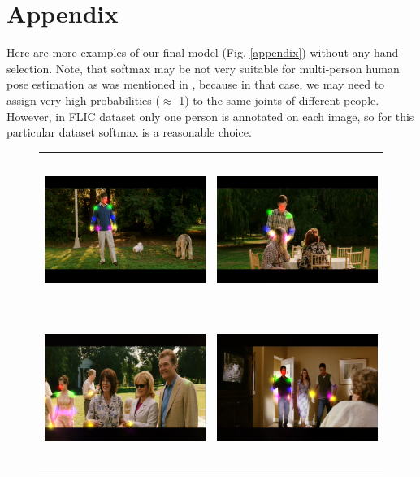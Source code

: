 \documentclass[a4paper,10pt]{article}
\begin{document}
	\section{Appendix}
	Here are more examples of our final model (Fig. \ref{appendix}) without any hand selection. Note, that softmax may be not very suitable for multi-person human pose estimation as was mentioned in \cite{deepcut}, because in that case, we may need to assign very high probabilities ($\approx$ 1) to the same joints of different people. However, in FLIC dataset only one person is annotated on each image, so for this particular dataset softmax is a reasonable choice.
	\begin{figure}[H]
		\begin{tabular}{cc}
			\includegraphics[height=4.9cm]{img/ap_sm1.png} & 
			\includegraphics[height=4.9cm]{img/ap_sm2.png} \\
			\includegraphics[height=4.9cm]{img/ap_sm3.png} &
			\includegraphics[height=4.9cm]{img/ap_sm4.png} \\

\end{tabular}
\end{figure}
\end{document}
